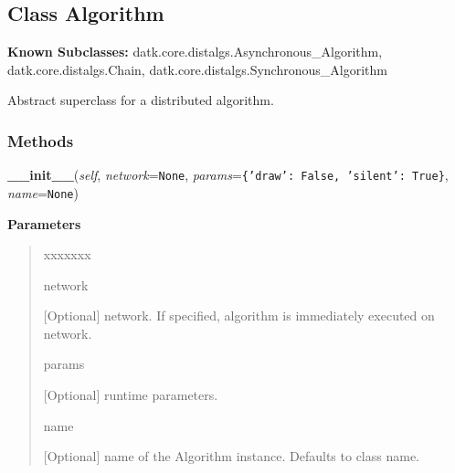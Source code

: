 \subsection{Class Algorithm}

    \label{datk:core:distalgs:Algorithm}
\textbf{Known Subclasses:}
datk.core.distalgs.Asynchronous\_Algorithm,
    datk.core.distalgs.Chain,
    datk.core.distalgs.Synchronous\_Algorithm

Abstract superclass for a distributed algorithm.



  \subsubsection{Methods}

    \label{datk:core:distalgs:Algorithm:__init__}

    \vspace{0.5ex}

\hspace{.8\funcindent}\begin{boxedminipage}{\funcwidth}

    \raggedright \textbf{\_\_init\_\_}(\textit{self}, \textit{network}={\tt None}, \textit{params}={\tt \texttt{\{}\texttt{'}\texttt{draw}\texttt{'}\texttt{: }False\texttt{, }\texttt{'}\texttt{silent}\texttt{'}\texttt{: }True\texttt{\}}}, \textit{name}={\tt None})

\setlength{\parskip}{2ex}
\setlength{\parskip}{1ex}
      \textbf{Parameters}
      \vspace{-1ex}

      \begin{quote}
        \begin{Ventry}{xxxxxxx}

          \item[network]

          [Optional] network. If specified, algorithm is immediately 
          executed on network.

          \item[params]

          [Optional] runtime parameters.

          \item[name]

          [Optional] name of the Algorithm instance. Defaults to class 
          name.

        \end{Ventry}

      \end{quote}

    \end{boxedminipage}

